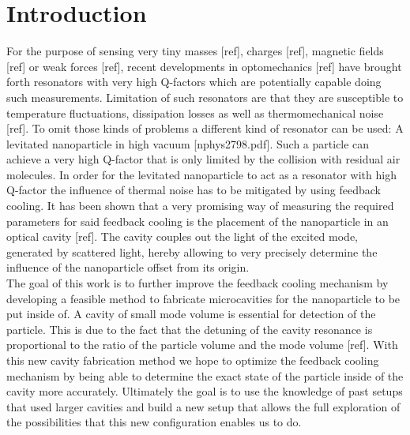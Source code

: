 \chapter{Introduction}
For the purpose of sensing very tiny masses [ref], charges [ref], magnetic fields [ref] or weak forces [ref], recent developments in optomechanics [ref] have brought forth resonators with very high Q-factors which are potentially capable doing such measurements. Limitation of such resonators are that they are susceptible to temperature fluctuations, dissipation losses as well as thermomechanical noise [ref]. To omit those kinds of problems a different kind of resonator can be used: A levitated nanoparticle in high vacuum [nphys2798.pdf]. Such a particle can achieve a very high Q-factor that is only limited by the collision with residual air molecules. In order for the levitated nanoparticle to act as a resonator with high Q-factor the influence of thermal noise has to be mitigated by using feedback cooling. It has been shown that a very promising way of measuring the required parameters for said feedback cooling is the placement of the nanoparticle in an optical cavity [ref]. The cavity couples out the light of the excited mode, generated by scattered light, hereby allowing to very precisely determine the influence of the nanoparticle offset from its origin.\\
The goal of this work is to further improve the feedback cooling mechanism by developing a feasible method to fabricate microcavities for the nanoparticle to be put inside of. A cavity of small mode volume is essential for detection of the particle. This is due to the fact that the detuning of the cavity resonance is proportional to the ratio of the particle volume and the mode volume [ref]. With this new cavity fabrication method we hope to optimize the feedback cooling mechanism by being able to determine the exact state of the particle inside of the cavity more accurately. Ultimately the goal is to use the knowledge of past setups that used larger cavities and build a new setup that allows the full exploration of the possibilities that this new configuration enables us to do.







